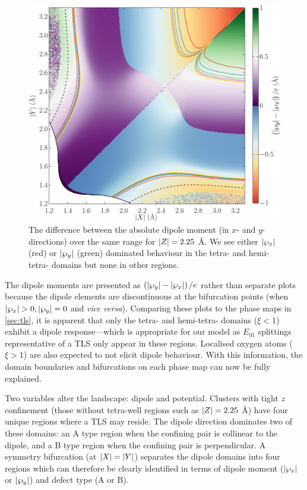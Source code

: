 \begin{figure}[htp]
\includegraphics[width=\textwidth]{figures/dipole225}
  \caption[Dipole Phase Map, With $\abs{Z} = 2.25$ \AA]{\label{fig:dipole225}The difference between the absolute dipole moment (in $x$- and $y$-directions) over the same range for $\abs{Z} = 2.25$ \AA. We see either $\lvert\wp_x\rvert$ (red) or $\lvert\wp_y\rvert$ (green) dominated behaviour in the tetra- and hemi-tetra- domains but none in other regions.}
\end{figure}

The dipole moments are presented as $\left(\lvert\wp_y\rvert-\lvert\wp_x\rvert\right)/e$ rather than separate plots because the dipole elements are discontinuous at the bifurcation points (\ie when $\lvert\wp_x\rvert>0, \lvert\wp_y\rvert=0$ and \textit{vice versa}).
Comparing these plots to the phase maps in \cref{sec:tls}, it is apparent that only the tetra- and hemi-tetra- domains ($\xi < 1$) exhibit a dipole response---which is appropriate for our model as $E_{01}$ splittings representative of a TLS only appear in these regions.
Localised oxygen atoms ($\xi > 1$) are also expected to not elicit dipole behaviour.
With this information, the domain boundaries and bifurcations on each phase map can now be fully explained.

Two variables alter the landscape: dipole and potential.
Clusters with tight $z$ confinement (those without tetra-well regions such as $\abs{Z} = 2.25$ \AA) have four unique regions where a TLS may reside.
The dipole direction dominates two of these domains: an A type region when the confining pair is collinear to the dipole, and a B type region when the confining pair is perpendicular.
A symmetry bifurcation (at $\lvert X\rvert = \lvert Y\rvert$) separates the dipole domains into four regions which can therefore be clearly identified in terms of dipole moment ($\lvert\wp_x\rvert$ or $\lvert\wp_y\rvert$) and defect type (A or B).


